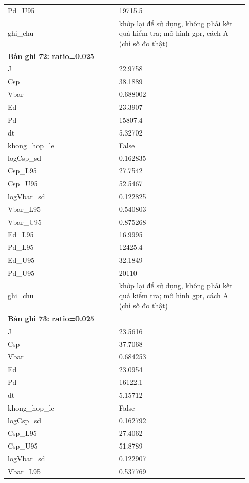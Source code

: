 \begin{longtable}{p{0.43\linewidth}p{0.50\linewidth}}
Pd\_\allowbreak U95 & 19715.5 \\
ghi\_\allowbreak chu & khớp lại để sử dụng, không phải kết quả kiểm tra; mô hình gpr, cách A (chỉ số đo thật) \\
\midrule
\multicolumn{2}{p{0.95\linewidth}}{\textbf{Bản ghi 72: ratio=0.025}} \\
J & 22.9758 \\
Csp & 38.1889 \\
Vbar & 0.688002 \\
Ed & 23.3907 \\
Pd & 15807.4 \\
dt & 5.32702 \\
khong\_\allowbreak hop\_\allowbreak le & False \\
logCsp\_\allowbreak sd & 0.162835 \\
Csp\_\allowbreak L95 & 27.7542 \\
Csp\_\allowbreak U95 & 52.5467 \\
logVbar\_\allowbreak sd & 0.122825 \\
Vbar\_\allowbreak L95 & 0.540803 \\
Vbar\_\allowbreak U95 & 0.875268 \\
Ed\_\allowbreak L95 & 16.9995 \\
Pd\_\allowbreak L95 & 12425.4 \\
Ed\_\allowbreak U95 & 32.1849 \\
Pd\_\allowbreak U95 & 20110 \\
ghi\_\allowbreak chu & khớp lại để sử dụng, không phải kết quả kiểm tra; mô hình gpr, cách A (chỉ số đo thật) \\
\midrule
\multicolumn{2}{p{0.95\linewidth}}{\textbf{Bản ghi 73: ratio=0.025}} \\
J & 23.5616 \\
Csp & 37.7068 \\
Vbar & 0.684253 \\
Ed & 23.0954 \\
Pd & 16122.1 \\
dt & 5.15712 \\
khong\_\allowbreak hop\_\allowbreak le & False \\
logCsp\_\allowbreak sd & 0.162792 \\
Csp\_\allowbreak L95 & 27.4062 \\
Csp\_\allowbreak U95 & 51.8789 \\
logVbar\_\allowbreak sd & 0.122907 \\
Vbar\_\allowbreak L95 & 0.537769 \\

\end{longtable}
